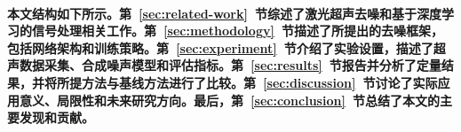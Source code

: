 \paragraph{本文结构如下所示。第~\ref{sec:related-work}~节综述了激光超声去噪和基于深度学习的信号处理相关工作。第~\ref{sec:methodology}~节描述了所提出的去噪框架，包括网络架构和训练策略。第~\ref{sec:experiment}~节介绍了实验设置，描述了超声数据采集、合成噪声模型和评估指标。第~\ref{sec:results}~节报告并分析了定量结果，并将所提方法与基线方法进行了比较。第~\ref{sec:discussion}~节讨论了实际应用意义、局限性和未来研究方向。最后，第~\ref{sec:conclusion}~节总结了本文的主要发现和贡献。}